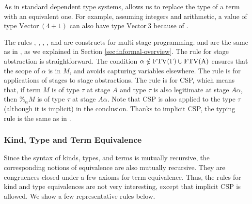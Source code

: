 
As in standard dependent type systems, \TConv{} allows us to replace the type
of a term with an equivalent one. For example, assuming integers and
arithmetic, a value of type $\textrm{Vector}\ (4+1)$ can also have type
$\textrm{Vector}\ 3$ because of \TConv{}.


The rules \TTB, \TTBL, \TGen, \TIns, and \TCsp{} are constructs for multi-stage
programming. \TTB{} and \TTBL{} are the same as in \LTP, as we explained in
Section \ref{sec:informal-overview}. The rule \TGen{} for stage abstraction is
straightforward. The condition $\alpha\notin\rm{FTV}(\Gamma)\cup\rm{FTV}(A)$
ensures that the scope of $\alpha$ is in $M$, and avoids capturing variables
elsewhere. The rule \TIns{} is for applications of stages to stage
abstractions. The rule \TCsp{} is for CSP, which means that, if term $M$ is of
type $\tau$ at stage $A$ and type \( \tau \) is also legitimate at stage \(
A\alpha \), then $\%_\alpha M$ is of type $\tau$ at stage $A\alpha$. Note that
CSP is also applied to the type \(\tau\) (although it is implicit) in the
conclusion. Thanks to implicit CSP, the typing rule is the same as in \LTP.

\subsubsection{Kind, Type and Term Equivalence}

Since the syntax of kinds, types, and terms is mutually recursive, the
corresponding notions of equivalence are also mutually recursive.  They are
congruences closed under a few axioms for term equivalence.  Thus, the rules
for kind and type equivalences are not very interesting, except that implicit
CSP is allowed.  We show a few representative rules below.

\begin{center}
        \hfil
        \\[2mm]
\end{center}

